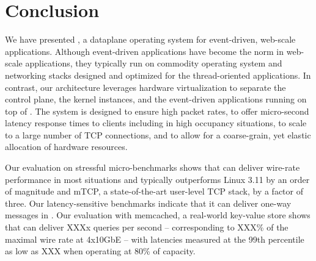 
\section{Conclusion}

We have presented \ix, a dataplane operating system for event-driven,
web-scale applications.  Although event-driven applications have
become the norm in web-scale applications, they typically run on
commodity operating system and networking stacks designed and
optimized for the thread-oriented applications.  In contrast, our
architecture leverages hardware virtualization to separate the control
plane, the \ix kernel instances, and the event-driven applications
running on top of \ix.  The system is designed to ensure high packet
rates, to offer micro-second latency response times to clients
including in high occupancy situations, to scale to a large number of 
TCP connections, and to allow for a coarse-grain, yet
elastic allocation of hardware resources.

Our evaluation on stressful micro-benchmarks shows that \ix can
deliver wire-rate performance in most situations and typically
outperforms Linux 3.11 by an order of magnitude and mTCP, a
state-of-the-art user-level TCP stack, by a factor of three.  Our
latency-sensitive benchmarks indicate that it can deliver one-way
messages in \microsecond.  Our evaluation with memcached, a
real-world key-value store shows that \ix can deliver XXXx queries per
second -- corresponding to XXX\% of the maximal wire rate at 4x10GbE -- with
latencies measured at the 99th percentile as low as XXX when operating
at 80\% of capacity. 


